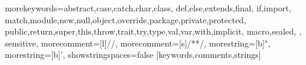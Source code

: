 
\newtheorem{thm}{Theorem}[section]
\newtheorem{corollary}{Corollary}[thm]
\newtheorem{lemma}[thm]{Lemma}
\newtheorem{defn}{Definition}[section]

\newcommand{\FP}{{\emph{function passing}}}

\newcommand{\ie}{{\em i.e.,~}}
\newcommand{\eg}{{\em e.g.,~}}

\newcommand{\comment}[1]{}
\newcommand{\fixme}[1]{{\color{gray}\itshape#1}}

%
{morekeywords={abstract,case,catch,char,class,%
    def,else,extends,final,%
    if,import,%
    match,module,new,null,object,override,package,private,protected,%
    public,return,super,this,throw,trait,try,type,val,var,with,implicit,%
    macro,sealed,%
  },%
  sensitive,%
  morecomment=[l]//,%
  morecomment=[s]{/*}{*/},%
  morestring=[b]",%
  morestring=[b]',%
  showstringspaces=false%
}[keywords,comments,strings]%


\newcommand{\gap}{\quad\quad}

\newcommand{\ba}{\begin{array}}
\newcommand{\ea}{\end{array}}

\newcommand{\seq}[1]{\overline{#1}}

\newcommand{\Req}[3]{\text{Req}_s(#1, #2, #3)}
\newcommand{\Res}[3]{\text{Res}_s(#1, #2, #3)}
\newcommand{\ReqF}[2]{\text{Req}_{\iota}(#1, #2)}
\newcommand{\ReqE}[3]{\text{Req}_f(#1, #2, #3)}
\newcommand{\Per}[3]{\text{Persist}(#1, #2, #3)}

\newcommand{\None}{\text{None}}
\newcommand{\Some}[1]{\text{Some}(#1)}

\newcommand{\Val}[1]{\text{Val}(#1)}
\newcommand{\Fwd}[1]{\text{Fwd}(#1)}

\newcommand{\consume}[3]{\text{consume}(#1, #2, #3)}

\newcommand{\note}[1]{{\bf $\clubsuit$ #1 $\spadesuit$}}

\newcommand{\text}[1]{\textrm{#1}}
